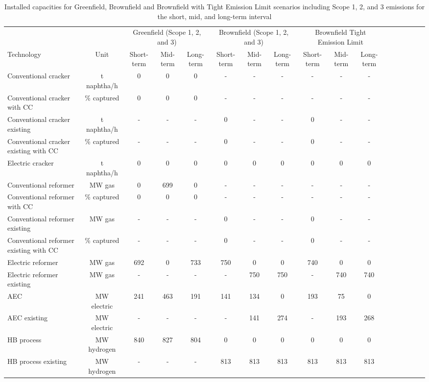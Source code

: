 \begin{table}[h!]
\centering
\caption{Installed capacities for Greenfield, Brownfield and Brownfield with Tight Emission Limit scenarios including Scope 1, 2, and 3 emissions for the short, mid, and long-term interval}
\label{tab:results_emission_limit}
\begin{adjustbox}{angle=90, max width=\textheight}\begin{tabular}{lcccccccccccccccc}
\toprule
\multicolumn{2}{r}{} & \multicolumn{3}{c}{Greenfield (Scope 1, 2, and 3)} & \multicolumn{3}{c}{Brownfield (Scope 1, 2, and 3)} & \multicolumn{3}{c}{Brownfield Tight Emission Limit} \\
Technology & Unit & Short-term & Mid-term & Long-term & Short-term & Mid-term & Long-term & Short-term & Mid-term & Long-term \\
\midrule
Conventional cracker & t naphtha/h & 0 & 0 & 0 & - & - & - & - & - & - \\
Conventional cracker with \acs{CC} & \% captured & 0 & 0 & 0 & - & - & - & - & - & - \\
Conventional cracker existing & t naphtha/h & - & - & - & 0 & - & - & 0 & - & - \\
Conventional cracker existing with \acs{CC} & \% captured & - & - & - & 0 & - & - & 0 & - & - \\
Electric cracker & t naphtha/h & 0 & 0 & 0 & 0 & 0 & 0 & 0 & 0 & 0 \\
Conventional reformer & MW gas & 0 & 699 & 0 & - & - & - & - & - & - \\
Conventional reformer with \acs{CC} & \% captured & 0 & 0 & 0 & - & - & - & - & - & - \\
Conventional reformer existing & MW gas & - & - & - & 0 & - & - & 0 & - & - \\
Conventional reformer existing with \acs{CC} & \% captured & - & - & - & 0 & - & - & 0 & - & - \\
Electric reformer & MW gas & 692 & 0 & 733 & 750 & 0 & 0 & 740 & 0 & 0 \\
Electric reformer existing & MW gas & - & - & - & - & 750 & 750 & - & 740 & 740 \\
\acs{AEC} & MW electric & 241 & 463 & 191 & 141 & 134 & 0 & 193 & 75 & 0 \\
\acs{AEC} existing & MW electric & - & - & - & - & 141 & 274 & - & 193 & 268 \\
\acs{HB} process & MW hydrogen & 840 & 827 & 804 & 0 & 0 & 0 & 0 & 0 & 0 \\
\acs{HB} process existing & MW hydrogen & - & - & - & 813 & 813 & 813 & 813 & 813 & 813 \\

\end{tabular}
\end{adjustbox}
\end{table}
